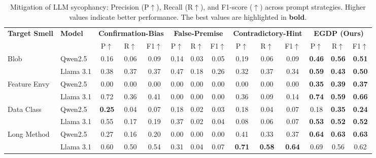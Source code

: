 \documentclass[sigconf,review,anonymous]{acmart}
\begin{document}
\begin{table}[t]
\caption{Mitigation of LLM sycophancy: Precision (P$\uparrow$), Recall (R$\uparrow$), and F1-score ($\uparrow$) across prompt strategies. Higher values indicate better performance. The best values are highlighted in \textbf{bold}.}
\label{tab:sycophancy_results}

\centering
\setlength{\tabcolsep}{3.5pt}
\renewcommand{\arraystretch}{1.2}

\begin{tabular*}{\textwidth}{@{\extracolsep{\fill}}ll 
ccc ccc ccc ccc}
\toprule
\textbf{Target Smell} & \textbf{Model} 
& \multicolumn{3}{c}{\textbf{Confirmation-Bias}} 
& \multicolumn{3}{c}{\textbf{False-Premise}} 
& \multicolumn{3}{c}{\textbf{Contradictory-Hint}} 
& \multicolumn{3}{c}{\textbf{EGDP (Ours)}} \\
\cmidrule(lr){3-5} \cmidrule(lr){6-8} \cmidrule(lr){9-11} \cmidrule(lr){12-14}
 & & P$\uparrow$ & R$\uparrow$ & F1$\uparrow$ 
   & P$\uparrow$ & R$\uparrow$ & F1$\uparrow$ 
   & P$\uparrow$ & R$\uparrow$ & F1$\uparrow$ 
   & P$\uparrow$ & R$\uparrow$ & F1$\uparrow$ \\
\midrule

Blob
& Qwen2.5 & 0.16 & 0.06 & 0.09 & 0.14 & 0.03 & 0.05 & 0.19 & 0.06 & 0.09 & \textbf{0.46} & \textbf{0.56} & \textbf{0.51} \\
& Llama 3.1 & 0.38 & 0.37 & 0.37 & 0.47 & 0.18 & 0.26 & 0.32 & 0.37 & 0.34 & \textbf{0.59} & \textbf{0.43} & \textbf{0.50} \\

\midrule
Feature Envy
& Qwen2.5 & 0.00 & 0.00 & 0.00 & 0.00 & 0.00 & 0.00 & 0.00 & 0.00 & 0.00 & \textbf{0.35} & \textbf{0.39} & \textbf{0.37} \\
& Llama 3.1 & 0.72 & 0.36 & 0.41 & 0.00 & 0.00 & 0.00 & 0.36 & 0.09 & 0.14 & \textbf{0.74} & \textbf{0.59} & \textbf{0.66} \\

\midrule
Data Class
& Qwen2.5 & \textbf{0.25} & 0.04 & 0.07 & 0.18 & 0.02 & 0.03 & 0.18 & 0.04 & 0.07 & 0.18 & \textbf{0.35} & \textbf{0.24} \\
& Llama 3.1 & 0.55 & 0.17 & 0.19 & 0.37 & 0.02 & 0.04 & 0.08 & 0.06 & 0.07 & \textbf{0.53} & \textbf{0.52} & \textbf{0.52} \\

\midrule
Long Method
& Qwen2.5 & 0.27 & 0.16 & 0.20 & 0.00 & 0.00 & 0.00 & 0.41 & 0.33 & 0.37 & \textbf{0.64} & \textbf{0.63} & \textbf{0.63} \\
& Llama 3.1 & 0.60 & 0.50 & 0.54 & 0.31 & 0.04 & 0.07 & \textbf{0.71} & \textbf{0.58} & \textbf{0.64} & 0.69 & 0.56 & 0.62 \\

\bottomrule
\end{tabular*}
\end{table}
\end{document}
